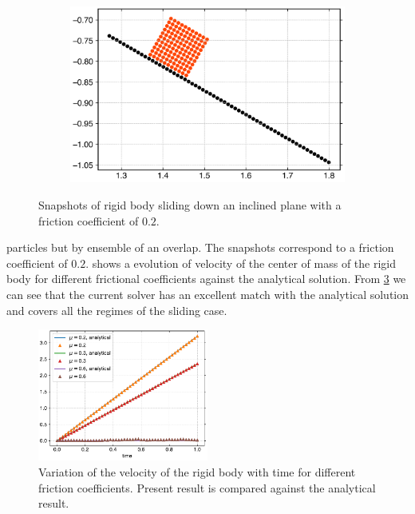 \begin{figure}[!htpb]
  \begin{subfigure}{0.48\textwidth}
    \centering
    \includegraphics[width=1.0\textwidth]{figures/rfc/figures/mohseni_2021_free_sliding_on_a_slope_2d/fric_coeff_0_2/time2}
    \label{fig:passing-2}
  \end{subfigure}
  \caption{Snapshots of rigid body sliding down an inclined plane with a
    friction coefficient of $0.2$.}
\label{fig:mohseni-2021-sliding-2d}
\end{figure}
particles but by ensemble of an overlap. The snapshots correspond to a
friction coefficient of $0.2$.
 shows a evolution of
velocity of the center of mass of the rigid body for different frictional
coefficients against the analytical solution. From
\cref{fig:results-solid-sliding-velocity-vs-time-2d} we can see that the current
solver has an excellent match with the analytical solution and covers all the
regimes of the sliding case.
\begin{figure}[!htpb]
  \centering
  \includegraphics[width=0.5\textwidth]{figures/rfc/figures/mohseni_2021_free_sliding_on_a_slope_2d/velocity_vs_time}
  \caption{Variation of the velocity of the rigid body with time for different
    friction coefficients. Present result is compared against the analytical
    result.}
\label{fig:results-solid-sliding-velocity-vs-time-2d}
\end{figure}

